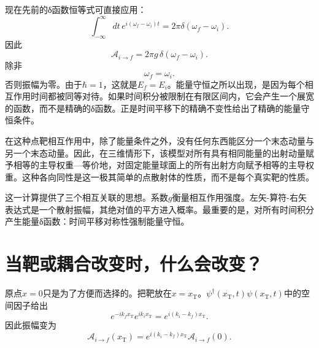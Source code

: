 现在先前的{\proseunicodefont δ}函数恒等式可直接应用：
\begin{equation}
\int_{-\infty}^{\infty}dt\,
e^{i(\omega_f-\omega_i)t}
=2\pi\delta(\omega_f-\omega_i).
\end{equation}
因此
\begin{equation}
\boxed{
\mathcal A_{i\to f}
=2\pi g\,\delta(\omega_f-\omega_i)
}.
\end{equation}
除非
\begin{equation}
\omega_f=\omega_i.
\end{equation}
否则振幅为零。由于\(\hbar=1\)，这就是\(E_f=E_i\)。能量守恒之所以出现，是因为每个相互作用时间都被同等对待。如果时间积分被限制在有限区间内，它会产生一个展宽的函数，而不是精确的{\proseunicodefont δ}函数。正是时间平移下的精确不变性给出了精确的能量守恒条件。

\begin{classroomqa}
\end{classroomqa}


在这种点靶相互作用中，除了能量条件之外，没有任何东西能区分一个末态动量与另一个末态动量。因此，在三维情形下，该模型对所有具有相同能量的出射动量赋予相等的主导权重---等价地，对固定能量球面上的所有出射方向赋予相等的主导权重。这种各向同性是这一极其简单的点散射体的性质，而不是每个真实靶的性质。

这一计算提供了三个相互关联的思想。系数\(g\)衡量相互作用强度。左矢-算符-右矢表达式是一个散射振幅，其绝对值的平方进入概率。最重要的是，对所有时间积分产生能量{\proseunicodefont δ}函数：时间平移对称性强制能量守恒。

\section{当靶或耦合改变时，什么会改变？}

原点\(x=0\)只是为了方便而选择的。把靶放在\(x=x_{\mathrm T}\)。\(\psi^\dagger(x_{\mathrm T},t)\psi(x_{\mathrm T},t)\)中的空间因子给出
\begin{equation}
e^{-ik_f x_{\mathrm T}}e^{ik_i x_{\mathrm T}}
=e^{i(k_i-k_f)x_{\mathrm T}}.
\end{equation}
因此振幅变为
\begin{equation}
\mathcal A_{i\to f}(x_{\mathrm T})
=e^{i(k_i-k_f)x_{\mathrm T}}
\mathcal A_{i\to f}(0).
\end{equation}

